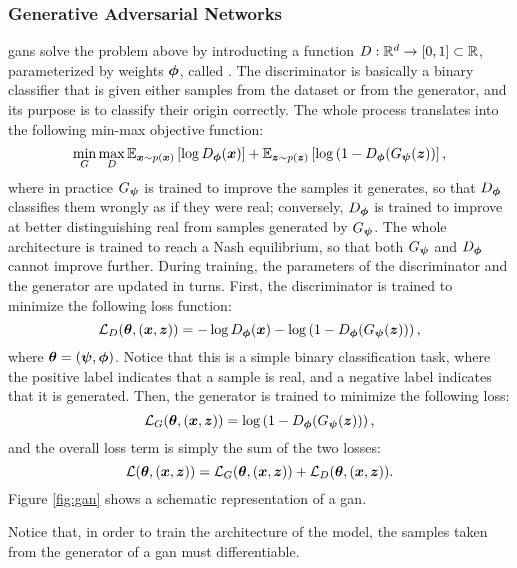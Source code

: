 \subsubsection*{Generative Adversarial Networks}
\glspl{gan} \citep{goodfellow2014gan} solve the problem above by introducting a function $D: \mathbb{R}^d \rightarrow [0,1] \subset \mathbb{R}$, parameterized by weights $\boldsymbol{\phi}$, called . The discriminator is basically a binary classifier that is given either samples from the dataset or from the generator, and its purpose is to classify their origin correctly. The whole process translates into the following min-max objective function:
$$\min_{G} \max_{D} \Expectation{\Vector{x} \sim p(\Vector{x})}{\log \Discriminator(\Vector{x})} + \Expectation{\Vector{z} \sim p(\Vector{z})}{\log\Par{1-\Discriminator(\Generator(\Vector{z})}},$$
where in practice $G_{\boldsymbol{\psi}}$ is trained to improve the samples it generates, so that $D_{\boldsymbol{\phi}}$ classifies them wrongly as if they were real; conversely, $D_{\boldsymbol{\phi}}$ is trained to improve at better distinguishing real from samples generated by $G_{\boldsymbol{\psi}}$. The whole architecture is trained to reach a Nash equilibrium, so that both $G_{\boldsymbol{\psi}}$ and $D_{\boldsymbol{\phi}}$ cannot improve further. During training, the parameters of the discriminator and the generator are updated in turns. First, the discriminator is trained to minimize the following loss function:
$$\Loss_D(\Param, (\Vector{x}, \Vector{z})) =  -\log \Discriminator(\Vector{x}) -\log\Par{1-\Discriminator(\Generator(\Vector{z}))},$$
where $\boldsymbol{\theta} = (\boldsymbol{\psi}, \boldsymbol{\phi})$. Notice that this is a simple binary classification task, where the positive label indicates that a sample is real, and a negative label indicates that it is generated. Then, the generator is trained to minimize the following loss:
$$\Loss_G(\Param, (\Vector{x}, \Vector{z})) = \log\Par{1-\Discriminator(\Generator(\Vector{z}))},$$
and the overall loss term is simply the sum of the two losses:
$$\Loss(\Param, (\Vector{x}, \Vector{z})) = \Loss_G(\Param, (\Vector{x}, \Vector{z})) + \Loss_D(\Param, (\Vector{x}, \Vector{z})).$$
Figure \ref{fig:gan} shows a schematic representation of a \gls{gan}.
\begin{figure*}[h!]
    \centering
    \resizebox{.75\textwidth}{!}{}
    \caption{A Generative Adversarial Network. Here, the tilde symbol over the vector yielded by the generator indicates that it does not come from the training set but it is generated. The discriminator $D$ must distinguish between generated and real samples (indicated without the tilde).}
    \label{fig:gan}
\end{figure*}
Notice that, in order to train the architecture of the model, the samples taken from the generator of a \gls{gan} must differentiable.